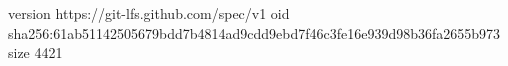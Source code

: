 version https://git-lfs.github.com/spec/v1
oid sha256:61ab51142505679bdd7b4814ad9cdd9ebd7f46c3fe16e939d98b36fa2655b973
size 4421
